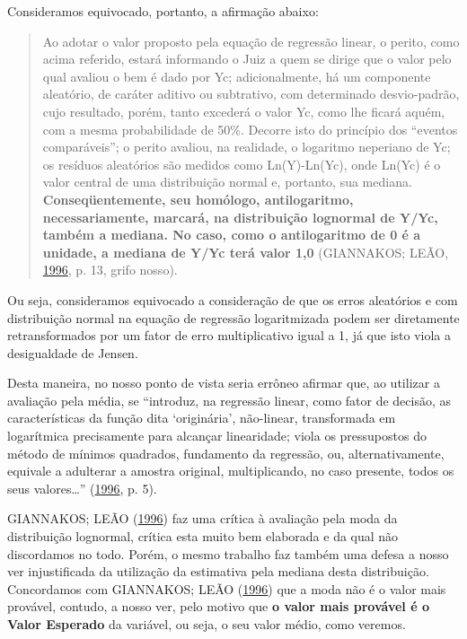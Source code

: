 \documentclass[a4paper, 12pt]{article}
\begin{document}
Consideramos equivocado, portanto, a afirmação abaixo:

\begin{quote}
Ao adotar o valor proposto pela equação de regressão linear, o perito,
como acima referido, estará informando o Juiz a quem se dirige que o
valor pelo qual avaliou o bem é dado por Yc; adicionalmente, há um
componente aleatório, de caráter aditivo ou subtrativo, com determinado
desvio-padrão, cujo resultado, porém, tanto excederá o valor Yc, como
lhe ficará aquém, com a mesma probabilidade de 50\%. Decorre isto do
princípio dos ``eventos comparáveis''; o perito avaliou, na realidade, o
logaritmo neperiano de Yc; os resíduos aleatórios são medidos como
Ln(Y)-Ln(Yc), onde Ln(Yc) é o valor central de uma distribuição normal
e, portanto, sua mediana. \textbf{Conseqüentemente, seu homólogo,
antilogaritmo, necessariamente, marcará, na distribuição lognormal de
Y/Yc, também a mediana. No caso, como o antilogaritmo de 0 é a unidade,
a mediana de Y/Yc terá valor 1,0} (GIANNAKOS; LEÃO,
\protect\hyperlink{ref-giannakos}{1996}, p. 13, grifo nosso).
\end{quote}

Ou seja, consideramos equivocado a consideração de que os erros
aleatórios e com distribuição normal na equação de regressão
logaritmizada podem ser diretamente retransformados por um fator de erro
multiplicativo igual a 1, já que isto viola a desigualdade de Jensen.

Desta maneira, no nosso ponto de vista seria errôneo afirmar que, ao
utilizar a avaliação pela média, se ``introduz, na regressão linear,
como fator de decisão, as características da função dita `originária',
não-linear, transformada em logarítmica precisamente para alcançar
linearidade; viola os pressupostos do método de mínimos quadrados,
fundamento da regressão, ou, alternativamente, equivale a adulterar a
amostra original, multiplicando, no caso presente, todos os seus
valores\ldots{}'' (\protect\hyperlink{ref-giannakos}{1996}, p. 5).

GIANNAKOS; LEÃO (\protect\hyperlink{ref-giannakos}{1996}) faz uma
crítica à avaliação pela moda da distribuição lognormal, crítica esta
muito bem elaborada e da qual não discordamos no todo. Porém, o mesmo
trabalho faz também uma defesa a nosso ver injustificada da utilização
da estimativa pela mediana desta distribuição. Concordamos com
GIANNAKOS; LEÃO (\protect\hyperlink{ref-giannakos}{1996}) que a moda não
é o valor mais provável, contudo, a nosso ver, pelo motivo que \textbf{o
valor mais provável é o Valor Esperado} da variável, ou seja, o seu
valor médio, como veremos.
\end{document}
